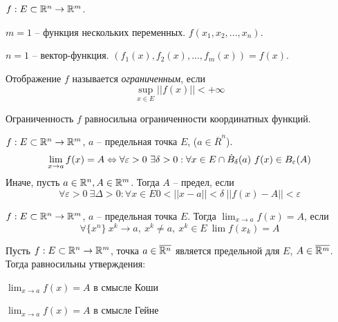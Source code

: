     
    $f : E \subset \mathbb{R}^n \to \mathbb{R}^m$.

    \begin{Example}
        $m = 1$ -- функция нескольких переменных. $f(x_1, x_2, ..., x_n)$.
    \end{Example}

    \begin{Example}
        $n = 1$ -- вектор-функция. $(f_1(x), f_2(x), ..., f_m(x)) = f(x)$.
    \end{Example}

    \begin{Def}
        Отображение $f$ называется \textit{ограниченным}, если
        \[\sup_{x \in E} ||f(x)|| < +\infty\] 
    \end{Def}

    \begin{Rem}
        Ограниченность $f$ равносильна ограниченности координатных функций.
    \end{Rem}

    \begin{Def}
        $f : E \subset \mathbb{R}^n \to \mathbb{R}^m$, $a$ -- предельная точка $E$, ($a \in \overline{R}^n$).
        \[\lim_{x \to a}f(x) = A \Leftrightarrow \forall \varepsilon > 0 \ \exists \delta > 0 : \forall x \in E \cap \dot{B}_\delta(a) \ f(x) \in B_\varepsilon(A)\]
        Иначе, пусть $a \in \mathbb{R}^n, A \in \mathbb{R}^m$. Тогда $A$ -- предел, если 
        \[\forall \varepsilon > 0 \ \exists \Delta > 0 : \forall x \in E 0 < ||x - a|| < \delta \ ||f(x) - A|| < \varepsilon\] 
    \end{Def}

    \begin{Def}
        $f : E \subset \mathbb{R}^n \to \mathbb{R}^m$, $a$ -- предельная точка $E$. 
        Тогда $\lim_{x \to a} f(x) = A$, если
        \[\forall \{x^n\} \ x^k \to a, \ x^k \neq a, \ x^k \in E \ \lim f(x_k) = A\]
    \end{Def}

    \begin{Thm}
        Пусть $f : E \subset \mathbb{R}^n \to \mathbb{R}^m$, точка $a \in \overline{\mathbb{R}^n}$ является предельной для $E$, $A \in \overline{\mathbb{R}^m}$. Тогда равносильны утверждения:
        \begin{MyList}
            \item $\displaystyle{\lim_{x \to a}} f(x) = A$ в смысле Коши
            \item $\displaystyle{\lim_{x \to a}} f(x) = A$ в смысле Гейне 
        \end{MyList}
    \end{Thm}

